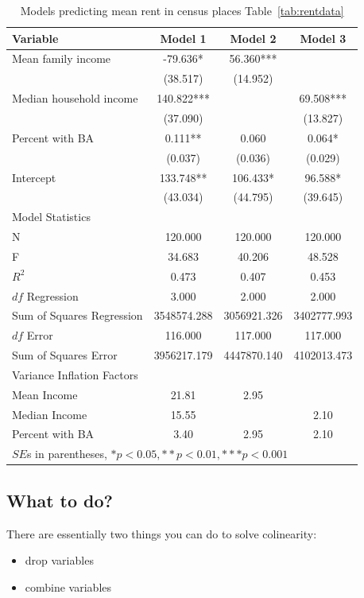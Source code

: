 \begin{table}[htbp]\centering
 \caption{Models predicting mean rent in census places Table~\ref{tab:rentdata}
\label{tab:rentmodel}}
\begin{tabular}{lccc}
\hline
Variable      &    Model 1 & Model 2 & Model 3 \\
\hline
Mean family income  &   -79.636* &   56.360***&        \\
      &  (38.517)  &  (14.952)  &        \\
Median household income  &   140.822***&        &   69.508***\\
      &  (37.090)  &        &  (13.827)  \\
Percent with BA  &   0.111** &    0.060  &    0.064* \\
      &   (0.037)  &   (0.036)  &   (0.029)  \\
Intercept  &   133.748** &   106.433* &   96.588* \\
      &  (43.034)  &  (44.795)  &  (39.645)  \\
\hline
\multicolumn{4}{l}{Model Statistics} \\
\hline
N      &   120.000  &   120.000  &   120.000  \\
F      &   34.683  &   40.206  &   48.528  \\
$R^2$    &    0.473  &    0.407  &    0.453  \\
$df$ Regression     &    3.000  &    2.000  &    2.000  \\
Sum of Squares Regression     & 3548574.288  & 3056921.326  & 3402777.993  \\
$df$ Error     &   116.000  &   117.000  &   117.000  \\
Sum of Squares Error     & 3956217.179  & 4447870.140  & 4102013.473  \\
\hline
\multicolumn{4}{l}{Variance Inflation Factors} \\
\hline
Mean Income & 21.81 & 2.95 & \\
Median Income & 15.55 & & 2.10 \\
Percent with BA & 3.40 & 2.95 & 2.10 \\
\hline
\multicolumn{4}{l}{$SE$s in parentheses, $*p<0.05,**p<0.01,***p<0.001$} \\
\hline
\end{tabular}
\end{table}

\subsection{What to do?}
There are essentially two things you can do to solve colinearity:
\begin{itemize}
\item{drop variables}
\item{combine variables}
\end{itemize}

